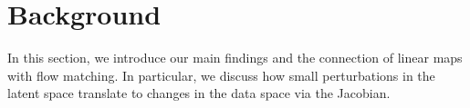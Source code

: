 \section{Background} \label{sec:background}
In this section, we introduce our main findings and the connection of linear maps with flow matching. In particular, we discuss how small perturbations in the latent space translate to changes in the data space via the Jacobian.

